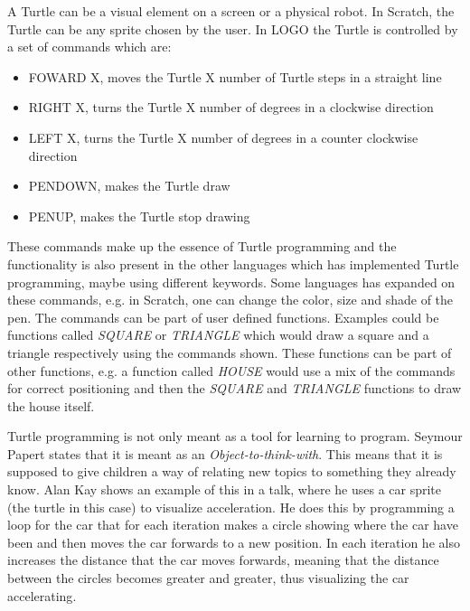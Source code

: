 A Turtle can be a visual element on a screen or a physical robot. In Scratch, the Turtle can be any sprite chosen by the user. In LOGO the Turtle is controlled by a set of commands which are:
\begin{itemize}
\item FOWARD X, moves the Turtle X number of Turtle steps in a straight line
\item RIGHT X, turns the Turtle X number of degrees in a clockwise direction
\item LEFT X, turns the Turtle X number of degrees in a counter clockwise direction
\item PENDOWN, makes the Turtle draw
\item PENUP, makes the Turtle stop drawing
\end{itemize}
These commands make up the essence of Turtle programming and the functionality is also present in the other languages which has implemented Turtle programming, maybe using different keywords. Some languages has expanded on these commands, e.g. in Scratch, one can change the color, size and shade of the pen. The commands can be part of user defined functions. Examples could be functions called \emph{SQUARE} or \emph{TRIANGLE} which would draw a square and a triangle respectively using the commands shown. These functions can be part of other functions, e.g. a function called \emph{HOUSE} would use a mix of the commands for correct positioning and then the \emph{SQUARE} and \emph{TRIANGLE} functions to draw the house itself\cite{turtle_func}.

Turtle programming is not only meant as a tool for learning to program. Seymour Papert states that it is meant as an \emph{Object-to-think-with}. This means that it is supposed to give children a way of relating new topics to something they already know. Alan Kay shows an example of this in a talk, where he uses a car sprite (the turtle in this case) to visualize acceleration. He does this by programming a loop for the car that for each iteration makes a circle showing where the car have been and then moves the car forwards to a new position. In each iteration he also increases the distance that the car moves forwards, meaning that the distance between the circles becomes greater and greater, thus visualizing the car accelerating\cite{alan_turtle_video}.

